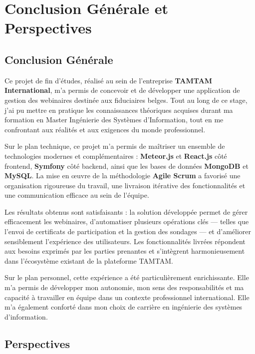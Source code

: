\chapter*{Conclusion Générale et Perspectives}

\section*{Conclusion Générale}

Ce projet de fin d'études, réalisé au sein de l'entreprise \textbf{TAMTAM International}, m'a permis de concevoir et de développer une application de gestion des webinaires destinée aux fiduciaires belges. Tout au long de ce stage, j'ai pu mettre en pratique les connaissances théoriques acquises durant ma formation en Master Ingénierie des Systèmes d'Information, tout en me confrontant aux réalités et aux exigences du monde professionnel.

Sur le plan technique, ce projet m'a permis de maîtriser un ensemble de technologies modernes et complémentaires : \textbf{Meteor.js} et \textbf{React.js} côté frontend, \textbf{Symfony} côté backend, ainsi que les bases de données \textbf{MongoDB} et \textbf{MySQL}. La mise en œuvre de la méthodologie \textbf{Agile Scrum} a favorisé une organisation rigoureuse du travail, une livraison itérative des fonctionnalités et une communication efficace au sein de l'équipe.

Les résultats obtenus sont satisfaisants : la solution développée permet de gérer efficacement les webinaires, d'automatiser plusieurs opérations clés — telles que l'envoi de certificats de participation et la gestion des sondages — et d'améliorer sensiblement l'expérience des utilisateurs. Les fonctionnalités livrées répondent aux besoins exprimés par les parties prenantes et s'intègrent harmonieusement dans l'écosystème existant de la plateforme TAMTAM.

Sur le plan personnel, cette expérience a été particulièrement enrichissante. Elle m'a permis de développer mon autonomie, mon sens des responsabilités et ma capacité à travailler en équipe dans un contexte professionnel international. Elle m'a également conforté dans mon choix de carrière en ingénierie des systèmes d'information.

\section*{Perspectives}

